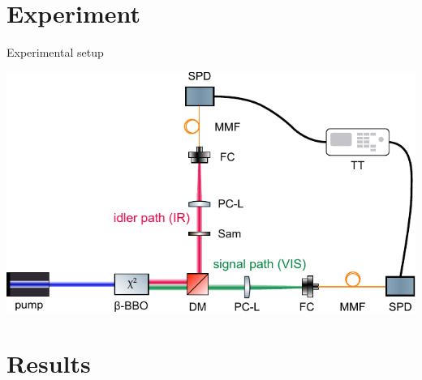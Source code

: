 \documentclass[10pt,aspectratio=43]{beamer}
\begin{document}
	\section{Experiment}
	\begin{frame}{Experimental setup}
			\begin{center}
				\includegraphics[width=.7\textwidth]{Images/DupishSetup.pdf}
			\end{center}
			
	\end{frame}
	\section{Results}
	
\end{document}
